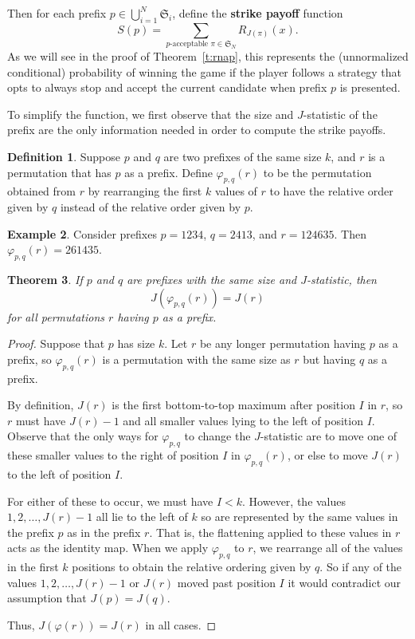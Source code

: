 \documentclass[11pt]{amsart}   %
\newtheorem{theorem}{Theorem}[section]
\theoremstyle{definition}
\newtheorem{definition}[theorem]{Definition}
\newtheorem{example}[theorem]{Example}
\theoremstyle{remark}
\numberwithin{equation}{section}
\theoremstyle{theorem}
\newcommand{\SN}{\mathfrak{S}}
\begin{document}
Then for each prefix $p \in \bigcup_{i=1}^N \SN_i$, define the {\bf strike
payoff} function
\[ S(p) = \sum\limits_{p\text{-acceptable } \pi \in \SN_N}  R_{J(\pi)}(x). \]
As we will see in the proof of Theorem~\ref{t:rnap}, this represents the
(unnormalized conditional) probability of winning the game if the player
follows a strategy that opts to always stop and accept the current candidate
when prefix $p$ is presented.  

To simplify the function, we first observe that the size and $J$-statistic of
the prefix are the only information needed in order to compute the strike
payoffs.

\begin{definition}
Suppose $p$ and $q$ are two prefixes of the same size $k$, and $r$ is a
permutation that has $p$ as a prefix.  Define $\varphi_{p, q}(r)$ to be the
permutation obtained from $r$ by rearranging the first $k$ values of $r$ to
have the relative order given by $q$ instead of the relative order given by
$p$.  
\end{definition}

\begin{example}
Consider prefixes $p=1234$,  $q=2413$, and $r=124635$. Then $\varphi_{p,q}(r)=261435$.
\end{example}

\begin{theorem}\label{t:tos}
If $p$ and $q$ are prefixes with the same size and $J$-statistic, then 
\[ J(\varphi_{p, q}(r)) = J(r) \]
for all permutations $r$ having $p$ as a prefix.
\end{theorem}
\begin{proof}
Suppose that $p$ has size $k$.  Let $r$ be any longer permutation having $p$ as
a prefix, so $\varphi_{p,q}(r)$ is a permutation with the same size as $r$ but
having $q$ as a prefix.

By definition, $J(r)$ is the first bottom-to-top maximum after position $I$ in
$r$, so $r$ must have $J(r)-1$ and all smaller values lying to the left of
position $I$.  Observe that the only ways for $\varphi_{p,q}$ to change the
$J$-statistic are to move one of these smaller values to the right of position
$I$ in $\varphi_{p,q}(r)$, or else to move $J(r)$ to the left of position $I$.

For either of these to occur, we must have $I < k$.  However, the values $1, 2,
\ldots, J(r)-1$ all lie to the left of $k$ so are represented by the same
values in the prefix $p$ as in the prefix $r$.  That is, the flattening
applied to these values in $r$ acts as the identity map.  When we apply
$\varphi_{p,q}$ to $r$, we rearrange all of the values in the first $k$
positions to obtain the relative ordering given by $q$.  So if any of the
values $1, 2, \ldots, J(r)-1$ or $J(r)$ moved past position $I$ it would
contradict our assumption that $J(p) = J(q)$.

Thus, $J(\varphi(r)) = J(r)$ in all cases.
\end{proof}
\end{document}
